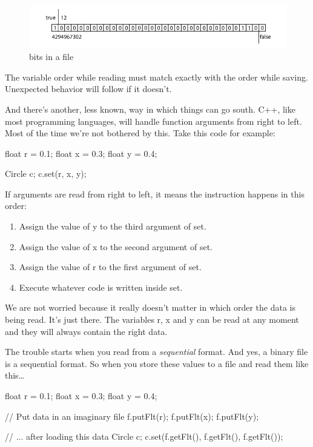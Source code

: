 \begin{figure}[ht]
\centering
\includegraphics[width=0.8\linewidth]{../images/filebits}
\caption[]{bits in a file}
\label{fig:filebits}
\end{figure}

\begin{note}
The variable order while reading must match exactly with the order while saving. Unexpected behavior will follow if it doesn't.
\end{note}

And there's another, less known, way in which things can go south. C++, like most programming languages, will handle function arguments from right to left. Most of the time we're not bothered by this. Take this code for example:
\begin{code}
float r = 0.1;
float x = 0.3;
float y = 0.4;

Circle c;
c.set(r, x, y);
\end{code}

If arguments are read from right to left, it means the instruction  happens in this order:

\begin{enumerate}
	\item Assign the value of y to the third argument of set.
	\item Assign the value of x to the second argument of set.
	\item Assign the value of r to the first argument of set.
	\item Execute whatever code is written inside set.
\end{enumerate}

We are not worried because it really doesn't matter in which order the data is being read. It's just there. The variables r, x and y can be read at any moment and they will always contain the right data.

The trouble starts when you read from a \textit{sequential} format. And yes, a binary file is a sequential format. So when you store these values to a file and read them like this\ldots

\begin{code}
float r = 0.1;
float x = 0.3;
float y = 0.4;

// Put data in an imaginary file
f.putFlt(r);
f.putFlt(x);
f.putFlt(y);

// ... after loading this data
Circle c;
c.set(f.getFlt(), f.getFlt(), f.getFlt());
\end{code}


